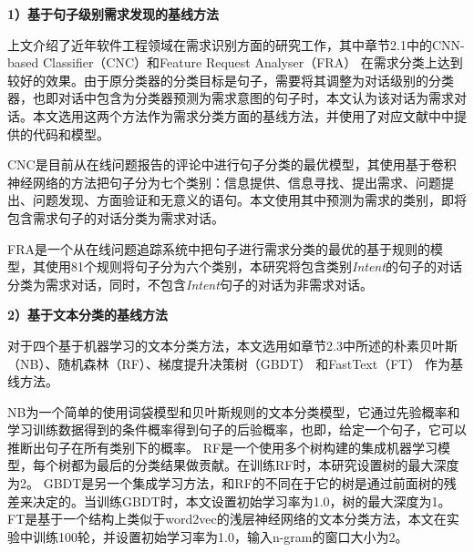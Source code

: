 \textbf{1）基于句子级别需求发现的基线方法}

上文介绍了近年软件工程领域在需求识别方面的研究工作，其中章节2.1中的CNN-based Classifier（CNC）\cite{Huang2018Automating}和Feature Request Analyser（FRA） \cite{shi2017understanding}在需求分类上达到较好的效果。由于原分类器的分类目标是句子，需要将其调整为对话级别的分类器，也即对话中包含为分类器预测为需求意图的句子时，本文认为该对话为需求对话。本文选用这两个方法作为需求分类方面的基线方法，并使用了对应文献中中提供的代码和模型。

CNC是目前从在线问题报告的评论中进行句子分类的最优模型，其使用基于卷积神经网络的方法把句子分为七个类别：信息提供、信息寻找、提出需求、问题提出、问题发现、方面验证和无意义的语句。本文使用其中预测为需求的类别，即将包含需求句子的对话分类为需求对话。

FRA是一个从在线问题追踪系统中把句子进行需求分类的最优的基于规则的模型，其使用81个规则将句子分为六个类别，本研究将包含类别\textit{Intent}的句子的对话分类为需求对话，同时，不包含\textit{Intent}句子的对话为非需求对话。

\textbf{2）基于文本分类的基线方法}

对于四个基于机器学习的文本分类方法，本文选用如章节2.3中所述的朴素贝叶斯（NB）\cite{mccallum1998comparison}、随机森林（RF）\cite{liaw2002classification}、梯度提升决策树（GBDT）\cite{ke2017lightgbm} 和FastText（FT）\cite{joulin2016bag} 作为基线方法。

NB为一个简单的使用词袋模型和贝叶斯规则的文本分类模型，它通过先验概率和学习训练数据得到的条件概率得到句子的后验概率，也即，给定一个句子，它可以推断出句子在所有类别下的概率。
RF是一个使用多个树构建的集成机器学习模型，每个树都为最后的分类结果做贡献。在训练RF时，本研究设置树的最大深度为2。
GBDT是另一个集成学习方法，和RF的不同在于它的树是通过前面树的残差来决定的。当训练GBDT时，本文设置初始学习率为1.0，树的最大深度为1。
FT是基于一个结构上类似于word2vec的浅层神经网络的文本分类方法，本文在实验中训练100轮，并设置初始学习率为1.0，输入n-gram的窗口大小为2。

